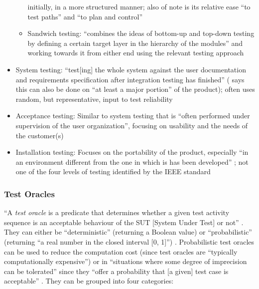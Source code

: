 \begin{itemize}
\begin{itemize}
{                              initially, in a more structured manner; also of
                              note is its relative ease ``to test paths'' and
                              ``to plan and control''
                              \cite[p.~490]{peters_software_2000}
                              }
                  \item Sandwich testing: ``combines the ideas of bottom-up and
                        top-down testing by defining a certain target layer in
                        the hierarchy of the modules'' and working towards it
                        from either end using the relevant testing approach
                        \cite[p.~491]{peters_software_2000}
            \end{itemize}
      \item System testing: ``test[ing] the whole system against the user
            documentation and requirements specification after integration
            testing has finished'' \cite[p.~439]{van_vliet_software_2000}
            (\cite[p.~109]{patton_software_2006} says this can also be done on
            ``at least a major portion'' of the product); often uses random,
            but representative, input to test reliability
            \cite[p.~439]{van_vliet_software_2000}
      \item Acceptance testing: Similar to system testing that is ``often
            performed under supervision of the user organization'',
            focusing on usability \cite[p.~439]{van_vliet_software_2000} and
            the needs of the customer(s) \cite[p.~492]{peters_software_2000}
      \item Installation testing: Focuses on the portability of the product,
            especially ``in an environment different from the one in which is
            has been developed'' \cite[p.~439]{van_vliet_software_2000}; not
            one of the four levels of testing identified by the IEEE standard
            \cite[p.~445]{peters_software_2000}
\end{itemize}

\subsubsection{Test Oracles}
``A \emph{test oracle} is a predicate that determines whether a given test
activity sequence is an acceptable behaviour of the SUT [System Under Test] or
not'' \cite[p.~509]{barr_oracle_2015}. They can either be ``deterministic''
(returning a Boolean value) or ``probabilistic'' (returning ``a real number in
the closed interval [0, 1]'') \cite[p.~509]{barr_oracle_2015}. Probabilistic
test oracles can be used to reduce the computation cost (since test oracles
are ``typically computationally expensive'') \cite[p.~509]{barr_oracle_2015}
or in ``situations where some degree of imprecision can be tolerated'' since
they ``offer a probability that [a given] test case is acceptable''
\cite[p.~510]{barr_oracle_2015}. They can be grouped into four categories:

